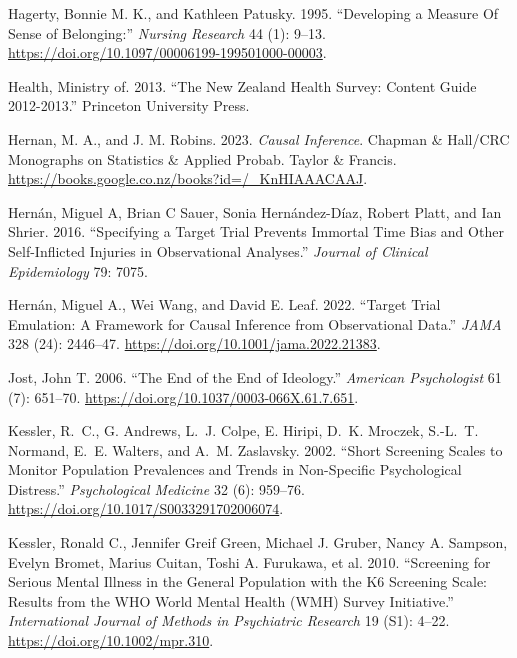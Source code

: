 \documentclass[
  singlecolumn]{report}
\newlength{\cslhangindent}
\newlength{\cslentryspacingunit} %
\newenvironment{CSLReferences}[2] %
 {%
  \setlength{\parindent}{0pt}
  \ifodd #1
  \let\oldpar\par
  \def\par{\hangindent=\cslhangindent\oldpar}
  \fi
  \setlength{\parskip}{#2\cslentryspacingunit}
 }%
 {}
\begin{document}
\begin{CSLReferences}{1}{0}
\leavevmode{}%
Hagerty, Bonnie M. K., and Kathleen Patusky. 1995. {``Developing a
Measure Of Sense of Belonging:''} \emph{Nursing Research} 44 (1): 9--13.
\url{https://doi.org/10.1097/00006199-199501000-00003}.

\leavevmode{}%
Health, Ministry of. 2013. {``The New Zealand Health Survey: Content
Guide 2012-2013.''} Princeton University Press.

\leavevmode{}%
Hernan, M. A., and J. M. Robins. 2023. \emph{Causal Inference}. Chapman
\& Hall/CRC Monographs on Statistics \& Applied Probab. Taylor \&
Francis. \url{https://books.google.co.nz/books?id=/_KnHIAAACAAJ}.

\leavevmode{}%
Hernán, Miguel A, Brian C Sauer, Sonia Hernández-Díaz, Robert Platt, and
Ian Shrier. 2016. {``Specifying a Target Trial Prevents Immortal Time
Bias and Other Self-Inflicted Injuries in Observational Analyses.''}
\emph{Journal of Clinical Epidemiology} 79: 7075.

\leavevmode{}%
Hernán, Miguel A., Wei Wang, and David E. Leaf. 2022. {``Target Trial
Emulation: A Framework for Causal Inference from Observational Data.''}
\emph{JAMA} 328 (24): 2446--47.
\url{https://doi.org/10.1001/jama.2022.21383}.

\leavevmode{}%
Jost, John T. 2006. {``The End of the End of Ideology.''} \emph{American
Psychologist} 61 (7): 651--70.
\url{https://doi.org/10.1037/0003-066X.61.7.651}.

\leavevmode{}%
Kessler, R.~C., G. Andrews, L.~J. Colpe, E. Hiripi, D.~K. Mroczek,
S.-L.~T. Normand, E.~E. Walters, and A.~M. Zaslavsky. 2002. {``Short
Screening Scales to Monitor Population Prevalences and Trends in
Non-Specific Psychological Distress.''} \emph{Psychological Medicine} 32
(6): 959--76. \url{https://doi.org/10.1017/S0033291702006074}.

\leavevmode{}%
Kessler, Ronald C., Jennifer Greif Green, Michael J. Gruber, Nancy A.
Sampson, Evelyn Bromet, Marius Cuitan, Toshi A. Furukawa, et al. 2010.
{``Screening for Serious Mental Illness in the General Population with
the K6 Screening Scale: Results from the WHO World Mental Health (WMH)
Survey Initiative.''} \emph{International Journal of Methods in
Psychiatric Research} 19 (S1): 4--22.
\url{https://doi.org/10.1002/mpr.310}.


\end{CSLReferences}
\end{document}
